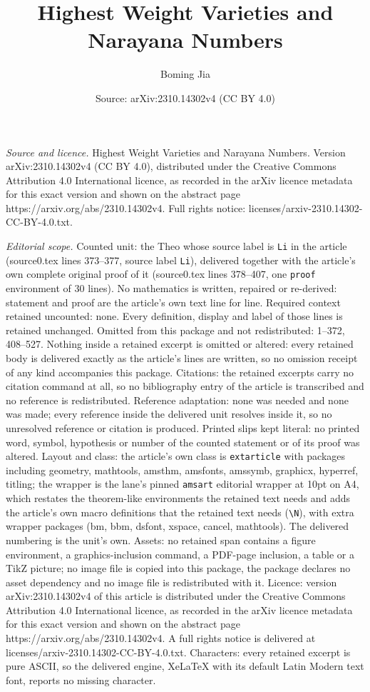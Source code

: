 \documentclass[10pt,a4paper]{amsart}
\title[Highest Weight Varieties and Narayana Numbers]{Highest Weight Varieties and Narayana Numbers}
\author{Boming Jia}
\date{Source: arXiv:2310.14302v4 (CC BY 4.0)}
\begin{document}
\maketitle

\noindent\emph{Source and licence.} Highest Weight Varieties and Narayana Numbers. Version arXiv:2310.14302v4 (CC BY 4.0), distributed under the Creative Commons Attribution 4.0 International licence, as recorded in the arXiv licence metadata for this exact version and shown on the abstract page https://arxiv.org/abs/2310.14302v4. Full rights notice: licenses/arxiv-2310.14302-CC-BY-4.0.txt.\par\smallskip

\noindent\textit{Editorial scope.} Counted unit: the Theo whose source label is \texttt{Li} in the article (source0.tex lines 373--377, source label \texttt{Li}), delivered together with the article's own complete original proof of it (source0.tex lines 378--407, one \texttt{proof} environment of 30 lines). No mathematics is written, repaired or re-derived: statement and proof are the article's own text line for line. Required context retained uncounted: none. Every definition, display and label of those lines is retained unchanged. Omitted from this package and not redistributed: 1--372, 408--527. Nothing inside a retained excerpt is omitted or altered: every retained body is delivered exactly as the article's lines are written, so no omission receipt of any kind accompanies this package. Citations: the retained excerpts carry no citation command at all, so no bibliography entry of the article is transcribed and no reference is redistributed. Reference adaptation: none was needed and none was made; every reference inside the delivered unit resolves inside it, so no unresolved reference or citation is produced. Printed slips kept literal: no printed word, symbol, hypothesis or number of the counted statement or of its proof was altered. Layout and class: the article's own class is \texttt{extarticle} with packages including geometry, mathtools, amsthm, amsfonts, amssymb, graphicx, hyperref, titling; the wrapper is the lane's pinned \texttt{amsart} editorial wrapper at 10pt on A4, which restates the theorem-like environments the retained text needs and adds the article's own macro definitions that the retained text needs (\texttt{\textbackslash N}), with extra wrapper packages (bm, bbm, dsfont, xspace, cancel, mathtools). The delivered numbering is the unit's own. Assets: no retained span contains a figure environment, a graphics-inclusion command, a PDF-page inclusion, a table or a TikZ picture; no image file is copied into this package, the package declares no asset dependency and no image file is redistributed with it. Licence: version arXiv:2310.14302v4 of this article is distributed under the Creative Commons Attribution 4.0 International licence, as recorded in the arXiv licence metadata for this exact version and shown on the abstract page https://arxiv.org/abs/2310.14302v4. A full rights notice is delivered at licenses/arxiv-2310.14302-CC-BY-4.0.txt. Characters: every retained excerpt is pure ASCII, so the delivered engine, XeLaTeX with its default Latin Modern text font, reports no missing character.
\end{document}
